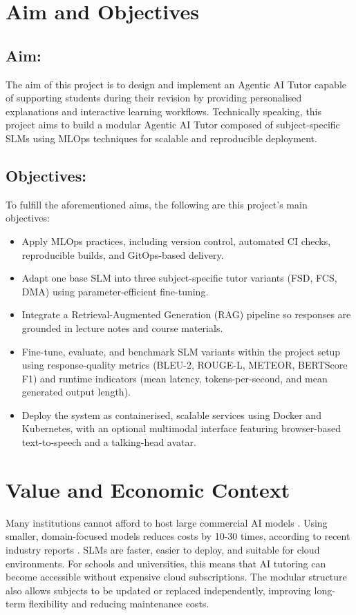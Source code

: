 \section{Aim and Objectives}
\subsection{Aim:}
The aim of this project is to design and implement an Agentic AI Tutor capable of supporting students during their revision by providing personalised explanations and interactive learning workflows. Technically speaking, this project aims to build a modular Agentic AI Tutor composed of subject-specific SLMs using MLOps techniques for scalable and reproducible deployment.

\subsection{Objectives:}
To fulfill the aforementioned aims, the following are this project's main objectives:

\begin{itemize}
    \item Apply MLOps practices, including version control, automated CI checks, reproducible builds, and GitOps-based delivery.
    \item Adapt one base SLM into three subject-specific tutor variants (FSD, FCS, DMA) using parameter-efficient fine-tuning.
    \item Integrate a Retrieval-Augmented Generation (RAG) pipeline so responses are grounded in lecture notes and course materials.
    \item Fine-tune, evaluate, and benchmark SLM variants within the project setup using response-quality metrics (BLEU-2, ROUGE-L, METEOR, BERTScore F1) and runtime indicators (mean latency, tokens-per-second, and mean generated output length).
    \item Deploy the system as containerised, scalable services using Docker and Kubernetes, with an optional multimodal interface featuring browser-based text-to-speech and a talking-head avatar.
\end{itemize}

\section{Value and Economic Context}
Many institutions cannot afford to host large commercial AI models \parencite{ChatGPTf63:online}. Using smaller, domain-focused models reduces costs by 10-30 times, according to recent industry reports \parencite{SmallLan73:online}. SLMs are faster, easier to deploy, and suitable for cloud environments. For schools and universities, this means that AI tutoring can become accessible without expensive cloud subscriptions. The modular structure also allows subjects to be updated or replaced independently, improving long-term flexibility and reducing maintenance costs.

